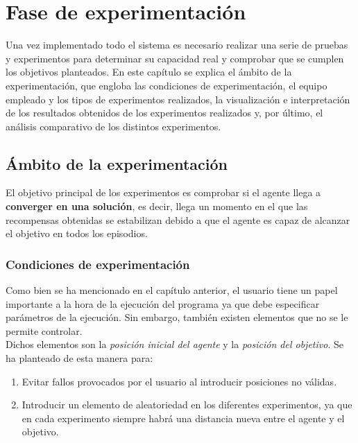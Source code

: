 
\chapter{Fase de experimentación}

Una vez implementado todo el sistema es necesario realizar una serie de pruebas y experimentos para determinar su capacidad real y comprobar que se cumplen los objetivos planteados. En este capítulo se explica el ámbito de la experimentación, que engloba las condiciones de experimentación, el equipo empleado y los tipos de experimentos realizados, la visualización e interpretación de los resultados obtenidos de los experimentos realizados y, por último, el análisis comparativo de los distintos experimentos.

\section{Ámbito de la experimentación}

El objetivo principal de los experimentos es comprobar si el agente llega a \textbf{converger en una solución}, es decir, llega un momento en el que las recompensas obtenidas se estabilizan debido a que el agente es capaz de alcanzar el objetivo en todos los episodios. 

\subsection{Condiciones de experimentación}

Como bien se ha mencionado en el capítulo anterior, el usuario tiene un papel importante a la hora de la ejecución del programa ya que debe especificar parámetros de la ejecución. Sin embargo, también existen elementos que no se le permite controlar. \\


Dichos elementos son la \textit{posición inicial del agente} y la \textit{posición del objetivo}. Se ha planteado de esta manera para:
\begin{enumerate}
    \item Evitar fallos provocados por el usuario al introducir posiciones no válidas. 
    \item Introducir un elemento de aleatoriedad en los diferentes experimentos, ya que en cada experimento siempre habrá una distancia nueva entre el agente y el objetivo. 
\end{enumerate}

